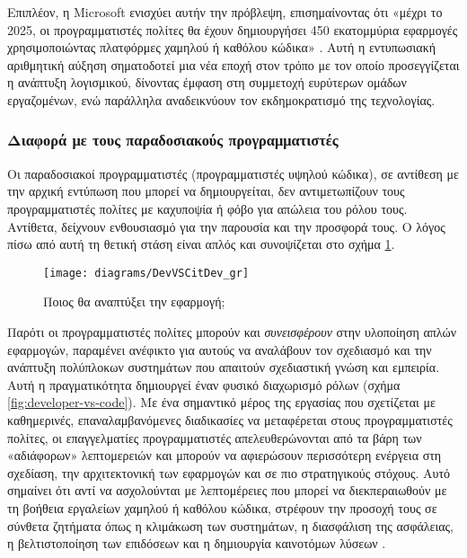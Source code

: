                 Επιπλέον, η Microsoft ενισχύει αυτήν την πρόβλεψη, επισημαίνοντας ότι «μέχρι το 2025, οι προγραμματιστές πολίτες θα έχουν δημιουργήσει 450 εκατομμύρια εφαρμογές χρησιμοποιώντας πλατφόρμες χαμηλού ή καθόλου κώδικα» \cite{cnbcNextFrontier}. Αυτή η εντυπωσιακή αριθμητική αύξηση σηματοδοτεί μια νέα εποχή στον τρόπο με τον οποίο προσεγγίζεται η ανάπτυξη λογισμικού, δίνοντας έμφαση στη συμμετοχή ευρύτερων ομάδων εργαζομένων, ενώ παράλληλα αναδεικνύουν τον εκδημοκρατισμό της τεχνολογίας.

                \subsubsection{Διαφορά με τους παραδοσιακούς προγραμματιστές}
                    Οι παραδοσιακοί προγραμματιστές (προγραμματιστές υψηλού κώδικα), σε αντίθεση με την αρχική εντύπωση που μπορεί να δημιουργείται, δεν αντιμετωπίζουν τους προγραμματιστές πολίτες με καχυποψία ή φόβο για απώλεια του ρόλου τους. Αντίθετα, δείχνουν ενθουσιασμό για την παρουσία και την προσφορά τους. Ο λόγος πίσω από αυτή τη θετική στάση είναι απλός και συνοψίζεται στο σχήμα \ref{fig:DevVSCitDev}.

                    \begin{figure}[h!] \noindent \centering
                        \texttt{[image: diagrams/DevVSCitDev\_gr]}
                        \caption{Ποιος θα αναπτύξει την εφαρμογή; \cite{LowCodeSimon}}
                        \label{fig:DevVSCitDev}
                    \end{figure}

                    Παρότι οι προγραμματιστές πολίτες μπορούν και \textit{συνεισφέρουν} στην υλοποίηση απλών εφαρμογών, παραμένει ανέφικτο για αυτούς να αναλάβουν τον σχεδιασμό και την ανάπτυξη πολύπλοκων συστημάτων που απαιτούν σχεδιαστική γνώση και εμπειρία. Αυτή η πραγματικότητα δημιουργεί έναν φυσικό διαχωρισμό ρόλων (σχήμα \ref{fig:developer-vs-code}). Με ένα σημαντικό μέρος της εργασίας που σχετίζεται με καθημερινές, επαναλαμβανόμενες διαδικασίες να μεταφέρεται στους προγραμματιστές πολίτες, οι επαγγελματίες προγραμματιστές απελευθερώνονται από τα βάρη των «αδιάφορων» λεπτομερειών και μπορούν να αφιερώσουν περισσότερη ενέργεια στη σχεδίαση, την αρχιτεκτονική των εφαρμογών και σε πιο στρατηγικούς στόχους. Αυτό σημαίνει ότι αντί να ασχολούνται με λεπτομέρειες που μπορεί να διεκπεραιωθούν με τη βοήθεια εργαλείων χαμηλού ή καθόλου κώδικα, στρέφουν την προσοχή τους σε σύνθετα ζητήματα όπως η κλιμάκωση των συστημάτων, η διασφάλιση της ασφάλειας, η βελτιστοποίηση των επιδόσεων και η δημιουργία καινοτόμων λύσεων \cite{Sahay2020}.

